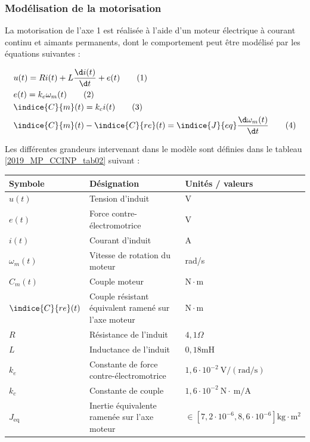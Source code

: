 \subsubsection{Modélisation de la motorisation}
La motorisation de l'axe 1 est réalisée à l'aide d'un moteur électrique à courant continu et aimants permanents, dont le comportement peut être modélisé par les équations suivantes :


\begin{align*}
& u(t)=R i(t)+L \dfrac{\d i(t)}{\d t}+e(t)  \tag{1}\\
& e(t)=k_{e} \omega_{m}(t) \tag{2} \\
& \indice{C}{m}(t)=k_{c} i(t) \tag{3}\\
& \indice{C}{m}(t)-\indice{C}{re}(t)=\indice{J}{eq} \dfrac{\d \omega_{m}(t)}{\d t} \tag{4}
\end{align*}


Les différentes grandeurs intervenant dans le modèle sont définies dans le tableau \ref{2019_MP_CCINP_tab02} suivant :

\begin{center}
\begin{tabular}[t]{lll}
\hline
\textbf{Symbole} & \textbf{Désignation} & \textbf{Unités / valeurs} \\
\hline
$u(t)$ & Tension d'induit & V \\
$e(t)$ & Force contre-électromotrice & V \\
$i(t)$ & Courant d'induit & A \\
$\omega_{m}(t)$ & Vitesse de rotation du moteur & rad/s \\
$C_{m}(t)$ & Couple moteur & $\mathrm{N} \cdot \mathrm{m}$ \\
$\indice{C}{re}(t)$ & Couple résistant équivalent ramené sur l'axe moteur & $\mathrm{N} \cdot \mathrm{m}$ \\
$R$ & Résistance de l'induit & $4,1 \Omega$ \\
$L$ & Inductance de l'induit & $0,18 \mathrm{mH}$ \\
$k_{e}$ & Constante de force contre-électromotrice & $1,6 \cdot 10^{-2} \mathrm{~V} /(\mathrm{rad} / \mathrm{s})$ \\
$k_{c}$ & Constante de couple & $1,6 \cdot 10^{-2} \mathrm{~N} \cdot \mathrm{~m} / \mathrm{A}$ \\
$J_{\text {eq }}$ & Inertie équivalente ramenée sur l'axe moteur & $\in\left[7,2 \cdot 10^{-6}, 8,6 \cdot 10^{-6}\right] \mathrm{kg} \cdot \mathrm{m}^{2}$ \\
\hline
\end{tabular}
\end{center}

